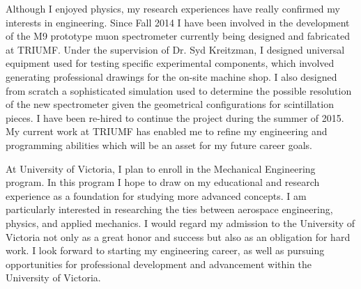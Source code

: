 \documentclass[11pt,a4paper,sans]{moderncv} %
\begin{document}
 Although I enjoyed physics, my research experiences have really confirmed my interests in engineering. Since Fall 2014 I have been involved in the development of the M9 prototype muon spectrometer currently being designed and fabricated at TRIUMF. Under the supervision of Dr. Syd Kreitzman, I designed universal equipment used for testing specific experimental components, which involved generating professional drawings for the on-site machine shop. I also designed from scratch a sophisticated simulation used to determine the possible resolution of the new spectrometer given the geometrical configurations for scintillation pieces. I have been re-hired to continue the project during the summer of 2015. My current work at TRIUMF has enabled me to refine my engineering and programming abilities which will be an asset for my future career goals.  
 
 At University of Victoria, I plan to enroll in the Mechanical Engineering program. In this program I hope to draw on my educational and research experience as a foundation for studying more advanced concepts. I am particularly interested in researching the ties between aerospace engineering, physics, and applied mechanics. I would regard my admission to the University of Victoria not only as a great honor and success but also as an obligation for hard work. I look forward to starting my engineering career, as well as pursuing opportunities for professional development and advancement within the University of Victoria.


\end{document}
